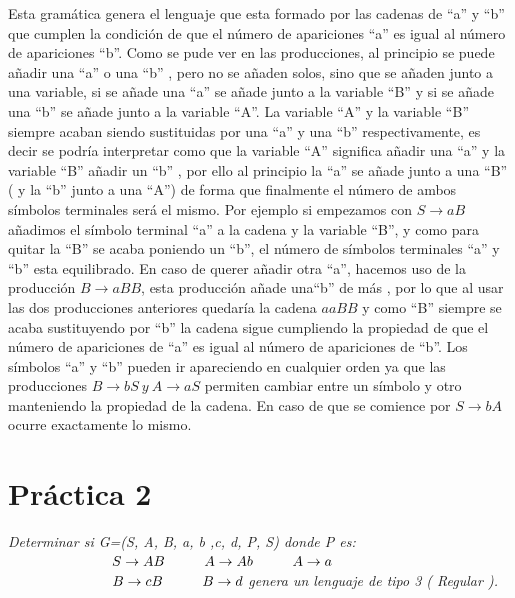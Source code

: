 Esta gramática genera el lenguaje que esta formado por las cadenas de ``a'' y ``b'' que cumplen la condición de que el número de apariciones ``a'' es igual al número de apariciones ``b''. Como se pude ver en las producciones, al principio se puede añadir una ``a'' o una ``b'' , pero no se añaden solos, sino que se añaden junto a una variable, si se añade una ``a'' se añade junto a la variable ``B'' y si se añade una ``b'' se añade junto a la variable ``A''. La variable ``A'' y la variable ``B'' siempre acaban siendo sustituidas por una ``a'' y una ``b'' respectivamente, es decir se podría interpretar como que la variable  ``A''  significa añadir una  ``a''  y la variable  ``B''  añadir un  ``b'' , por ello al principio la ``a'' se añade junto a una ``B'' ( y  la ``b'' junto a una  ``A'') de forma que finalmente el número de ambos símbolos terminales será el mismo. Por ejemplo si empezamos con $S \rightarrow aB$ añadimos el símbolo terminal ``a'' a la cadena y la variable ``B'',  y como para quitar la ``B'' se acaba poniendo un ``b'', el número de símbolos terminales ``a'' y ``b'' esta equilibrado. En caso de querer añadir otra ``a'', hacemos uso de la producción $B\rightarrow aBB$, esta producción añade una``b'' de más , por lo que al usar las dos producciones anteriores quedaría la cadena $aaBB$ y como ``B'' siempre se acaba sustituyendo por ``b'' la cadena sigue cumpliendo la propiedad de que el número de apariciones de ``a'' es igual al número de apariciones de ``b''. Los símbolos ``a'' y ``b'' pueden ir apareciendo en cualquier orden ya que las producciones $B\rightarrow bS \  y\   A\rightarrow aS$ permiten cambiar entre un símbolo y otro manteniendo la propiedad de la cadena. En caso de que se comience por $S\rightarrow bA$ ocurre exactamente lo mismo.

\section{Práctica 2}
\textit{Determinar si G=({S, A, B}, {a, b ,c, d}, P, S) donde P es:}\vspace{1em} \newline
$ \hspace*{2.6cm}S\rightarrow AB \hspace{1cm} A\rightarrow Ab  \hspace{1cm} A\rightarrow a$ \newline
$\hspace*{2.6cm}  B\rightarrow cB \hspace{1cm}B\rightarrow d $\vspace{1em}\newline
\hspace*{2cm} \textit{genera un lenguaje de tipo 3 ( Regular ).} \newline

